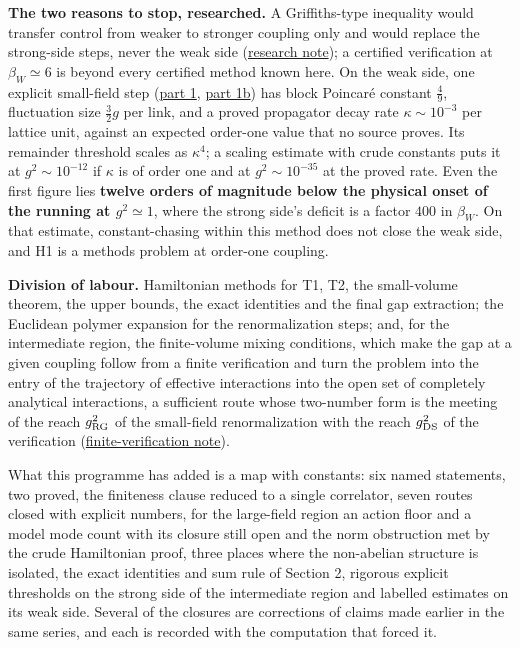 \documentclass[11pt,a4paper]{article}
\begin{document}
\textbf{The two reasons to stop, researched.} A Griffiths-type
inequality would transfer control from weaker to stronger coupling only
and would replace the strong-side steps, never the weak side
(\href{reasons-to-stop-as-research.md}{research note}); a certified
verification at \(\beta_W\simeq6\) is beyond every certified method
known here. On the weak side, one explicit small-field step
(\href{small-field-step-gaussian.md}{part 1},
\href{small-field-step-decay-and-threshold.md}{part 1b}) has block
Poincaré constant \(\frac49\), fluctuation size \(\frac32g\) per link,
and a proved propagator decay rate \(\kappa\sim10^{-3}\) per lattice
unit, against an expected order-one value that no source proves. Its
remainder threshold scales as \(\kappa^4\); a scaling estimate with
crude constants puts it at \(g^2\sim10^{-12}\) if \(\kappa\) is of order
one and at \(g^2\sim10^{-35}\) at the proved rate. Even the first figure
lies \textbf{twelve orders of magnitude below the physical onset of the
running at \(g^2\simeq1\)}, where the strong side's deficit is a factor
\(400\) in \(\beta_W\). On that estimate, constant-chasing within this
method does not close the weak side, and H1 is a methods problem at
order-one coupling.

\textbf{Division of labour.} Hamiltonian methods for T1, T2, the
small-volume theorem, the upper bounds, the exact identities and the
final gap extraction; the Euclidean polymer expansion for the
renormalization steps; and, for the intermediate region, the
finite-volume mixing conditions, which make the gap at a given coupling
follow from a finite verification and turn the problem into the entry of
the trajectory of effective interactions into the open set of completely
analytical interactions, a sufficient route whose two-number form is the
meeting of the reach \(g_{\rm RG}^2\) of the small-field renormalization
with the reach \(g_{\rm DS}^2\) of the verification
(\href{intermediate-region-finite-verification.md}{finite-verification
note}).

What this programme has added is a map with constants: six named
statements, two proved, the finiteness clause reduced to a single
correlator, seven routes closed with explicit numbers, for the
large-field region an action floor and a model mode count with its
closure still open and the norm obstruction met by the crude Hamiltonian
proof, three places where the non-abelian structure is isolated, the
exact identities and sum rule of Section 2, rigorous explicit thresholds
on the strong side of the intermediate region and labelled estimates on
its weak side. Several of the closures are corrections of claims made
earlier in the same series, and each is recorded with the computation
that forced it.
\end{document}

